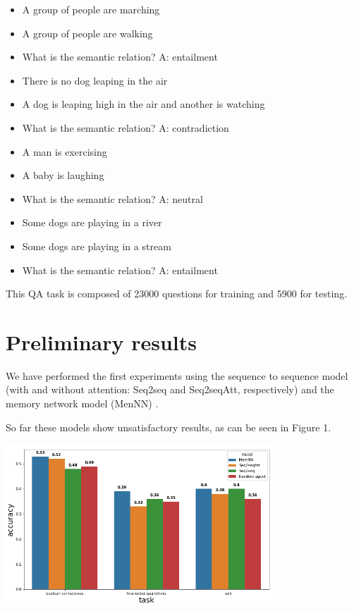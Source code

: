 \begin{itemize} 
\item[] A group of people are marching
\item[] A group of people are walking
\item[] What is the semantic relation? A: entailment
\end{itemize}

\begin{itemize} 
\item[] There is no dog leaping in the air
\item[] A dog is leaping high in the air and another is watching
\item[] What is the semantic relation? A: contradiction
\end{itemize}

\begin{itemize} 
\item[] A man is exercising
\item[] A baby is laughing
\item[] What is the semantic relation? A: neutral
\end{itemize}

\begin{itemize} 
\item[] Some dogs are playing in a river
\item[] Some dogs are playing in a stream
\item[] What is the semantic relation? A: entailment
\end{itemize}

This QA task is composed of 23000 questions for training and 5900 for testing.

\section{Preliminary results}
\label{ch:03-preliminary-results}

We have performed the first experiments using the sequence to sequence model \cite{Sustskever}(with and without attention: Seq2seq and Seq2seqAtt, respectively) and the memory network model (MenNN) \cite{WestonCB14}.

So far these models show unsatisfactory results, as can be seen in Figure 1.

\begin{center}
\includegraphics[width=10.0cm]{img/comparative_results.png}
\end{center}

